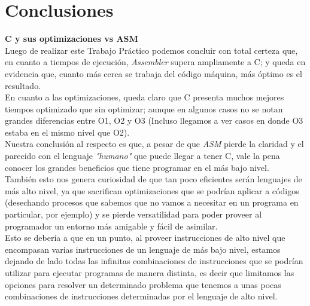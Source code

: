 \documentclass[a4paper]{article}
\begin{document}
\section{Conclusiones}
\textbf{C y sus optimizaciones vs ASM} \\
Luego de realizar este Trabajo Práctico podemos concluir con total certeza que, en cuanto a tiempos de ejecución, \textit{Assembler} supera ampliamente a C; y queda en evidencia que, cuanto más cerca se trabaja del código máquina, más óptimo es el resultado. \\
En cuanto a las optimizaciones, queda claro que C presenta muchos mejores tiempos optimizado que sin optimizar; aunque en algunos casos no se notan grandes diferencias entre O1, O2 y O3 (Incluso llegamos a ver casos en donde O3 estaba en el mismo nivel que O2). \\
Nuestra conclusión al respecto es que, a pesar de que \textit{ASM} pierde la claridad y el parecido con el lenguaje \textit{"humano"} que puede llegar a tener C, vale la pena conocer los grandes beneficios que tiene programar en el más bajo nivel. \\
También esto nos genera curiosidad de que tan poco eficientes serán lenguajes de más alto nivel, ya que sacrifican optimizaciones que se podr\'{i}an aplicar a c\'{o}digos (desechando procesos que sabemos que no vamos a necesitar en un programa en particular, por ejemplo) y se pierde versatilidad para poder proveer al programador un entorno m\'{a}s amigable y f\'{a}cil de asimilar. \\
Esto se deber\'{i}a a que en un punto, al proveer instrucciones de alto nivel que encompasan varias instrucciones de un lenguaje de m\'{a}s bajo nivel, estamos dejando de lado todas las infinitas combinaciones de instrucciones que se podr\'{i}an utilizar para ejecutar programas de manera distinta, es decir que limitamos las opciones para resolver un determinado problema que tenemos a unas pocas combinaciones de instrucciones determinadas por el lenguaje de alto nivel. \\
\end{document}
